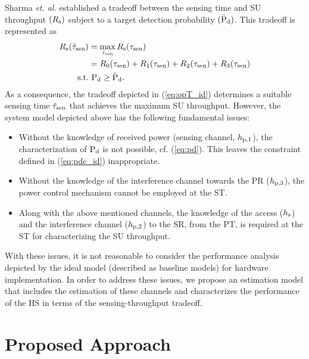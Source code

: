 Sharma \textit{et. al.} \cite{Sharma14} established a tradeoff between the sensing time and SU throughput $(R_{\text{s}})$ subject to a target detection probability $(\bar{\text{P}}_{\text{d}})$. This tradeoff is represented as
\begin{align}
\rs(\ttsen) &= \maxi_{\tsen} \rs(\tsen) \label{eq:opT_id}\\ 
\quad &= \rsz(\tsen) + \rso(\tsen) + \rstw(\tsen) + \rsth(\tsen) \nonumber  \\
\text{s.t.} & \text{ } \pd \ge \pdd. \label{eq:pdc_id} 
\end{align}
As a consequence, the tradeoff depicted in (\ref{eq:opT_id}) determines a suitable sensing time $\tilde{\tau}_{\text{sen}}$ that achieves the maximum SU throughput.
However, the system model depicted above has the following fundamental issues:
\begin{itemize}
\item Without the knowledge of received power (sensing channel, $h_{\text{p,1}}$), the characterization of $\text{P}_{\text{d}}$ is not possible, cf. (\ref{eq:pd}). This leaves the constraint defined in (\ref{eq:pdc_id}) inappropriate. 
\item Without the knowledge of the interference channel towards the PR ($h_{\text{p,3}}$), the power control mechanism cannot be employed at the ST.
\item Along with the above mentioned channels, the knowledge of the access ($h_{\text{s}}$) and the interference channel ($h_{\text{p,2}}$) to the SR, from the PT, is required at the ST for characterizing the SU throughput. 
\end{itemize} 
With these issues, it is not reasonable to consider the performance analysis depicted by the ideal model (described as baseline models) for hardware implementation. In order to address these issues, we propose an estimation model that includes the estimation of these channels and characterizes the performance of the HS in terms of the sensing-throughput tradeoff. 
\section{Proposed Approach} \label{sec:pm}
